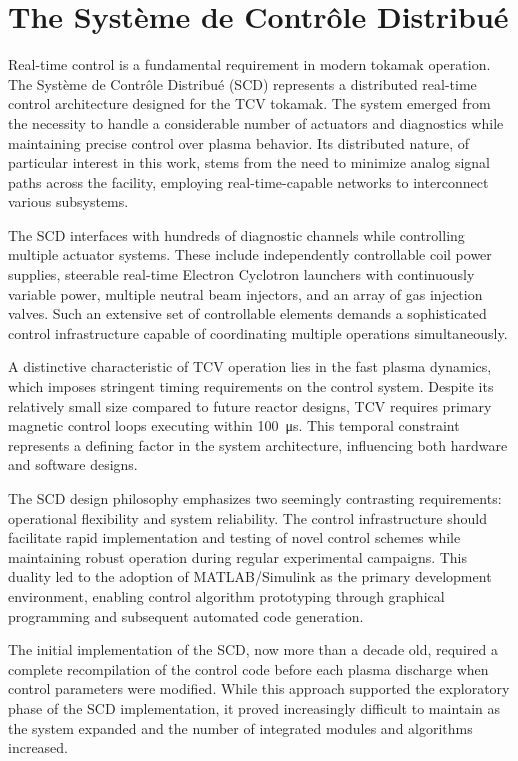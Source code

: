 \section{The Système de Contrôle Distribué}
\label{sec:scd}
Real-time control is a fundamental requirement in modern tokamak operation. The Système de Contrôle Distribué (SCD) \cite{le_distributed_2014,anand_distributed_2017,galperti_overview_2024} represents a distributed real-time control architecture designed for the TCV tokamak. The system emerged from the necessity to handle a considerable number of actuators and diagnostics while maintaining precise control over plasma behavior. Its distributed nature, of particular interest in this work, stems from the need to minimize analog signal paths across the facility, employing real-time-capable networks to interconnect various subsystems.

The SCD interfaces with hundreds of diagnostic channels while controlling multiple actuator systems. These include independently controllable coil power supplies, steerable real-time Electron Cyclotron launchers with continuously variable power, multiple neutral beam injectors, and an array of gas injection valves. Such an extensive set of controllable elements demands a sophisticated control infrastructure capable of coordinating multiple operations simultaneously.

A distinctive characteristic of TCV operation lies in the fast plasma dynamics, which imposes stringent timing requirements on the control system. Despite its relatively small size compared to future reactor designs, TCV requires primary magnetic control loops executing within \SI{100}{\micro\second}. This temporal constraint represents a defining factor in the system architecture, influencing both hardware and software designs.

The SCD design philosophy emphasizes two seemingly contrasting requirements: operational flexibility and system reliability. The control infrastructure should facilitate rapid implementation and testing of novel control schemes while maintaining robust operation during regular experimental campaigns. This duality led to the adoption of MATLAB/Simulink as the primary development environment, enabling control algorithm prototyping through graphical programming and subsequent automated code generation.

The initial implementation of the SCD, now more than a decade old, required a complete  recompilation of the control code before each plasma discharge when control parameters were modified. While this approach supported the exploratory phase of the SCD implementation, it proved increasingly difficult to maintain as the system expanded and the number of integrated modules and algorithms increased.

